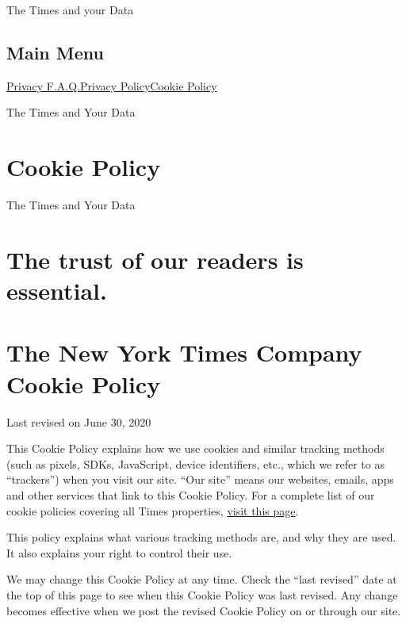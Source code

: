 The Times and your Data

\hypertarget{main-menu}{%
\subsection{Main Menu}\label{main-menu}}

\href{/privacy}{Privacy F.A.Q.}\href{/privacy/privacy-policy}{Privacy
Policy}\href{/privacy/cookie-policy}{Cookie Policy}

The Times and Your Data

\hypertarget{cookie-policy}{%
\section{Cookie Policy}\label{cookie-policy}}

The Times and Your Data

\hypertarget{the-trust-of-our-readers-is-essential}{%
\section{The trust of our readers is
essential.}\label{the-trust-of-our-readers-is-essential}}

\hypertarget{the-new-york-times-company-cookie-policy}{%
\section{The New York Times Company Cookie
Policy}\label{the-new-york-times-company-cookie-policy}}

Last revised on June 30, 2020

This Cookie Policy explains how we use cookies and similar tracking
methods (such as pixels, SDKs, JavaScript, device identifiers, etc.,
which we refer to as ``trackers'') when you visit our site. ``Our site''
means our websites, emails, apps and other services that link to this
Cookie Policy. For a complete list of our cookie policies covering all
Times properties,
\href{https://www.nytimes3xbfgragh.onion/subscription/dg-cookie-policy/cookie-policy.html}{visit
this page}.

This policy explains what various tracking methods are, and why they are
used. It also explains your right to control their use.

We may change this Cookie Policy at any time. Check the ``last revised''
date at the top of this page to see when this Cookie Policy was last
revised. Any change becomes effective when we post the revised Cookie
Policy on or through our site.

